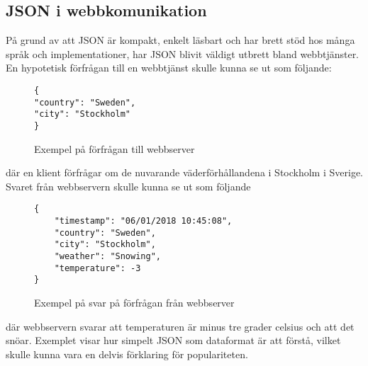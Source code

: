 \documentclass[swedish]{kththesis}
\begin{document}
\subsection{JSON i webbkomunikation}
\label{sec:intr:bakgrund:json-web}
På grund av att JSON är kompakt, enkelt läsbart och har brett stöd hos många språk och implementationer, har JSON blivit väldigt utbrett bland webbtjänster. En hypotetisk förfrågan till en webbtjänst skulle kunna se ut som följande:

\begin{figure}[h]
	\begin{verbatim}
{
"country": "Sweden",
"city": "Stockholm"
}
	\end{verbatim}
	\vspace{-1.5em}
	\caption{Exempel på förfrågan till webbserver}
\end{figure}

\noindent
där en klient förfrågar om de nuvarande väderförhållandena i Stockholm i Sverige. Svaret från webbservern skulle kunna se ut som följande

\begin{figure}[h]
	\begin{verbatim}
{
	"timestamp": "06/01/2018 10:45:08",
	"country": "Sweden",
	"city": "Stockholm",
	"weather": "Snowing",
	"temperature": -3
}
	\end{verbatim}
	\vspace{-1.5em}
	\caption{Exempel på svar på förfrågan från webbserver}
\end{figure}

\noindent
där webbservern svarar att temperaturen är minus tre grader celsius och att det snöar. Exemplet visar hur simpelt JSON som dataformat är att förstå, vilket skulle kunna vara en delvis förklaring för populariteten.


\end{document}
